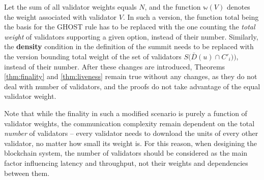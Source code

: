 \documentclass[12pt, fleqn]{article}
\newcommand{\ww}{\mathbb{w}}
\begin{document}
Let the sum of all validator weights equals $N$, and the function $\ww(V)$ denotes the weight associated with validator $V$.
In such a version, the function $\mathrm{total}$ being the basis for the GHOST rule has to be replaced with the one counting the \emph{total weight} of validators supporting a given option, instead of their number. 
Similarly, the \textbf{density} condition in the definition of the summit needs to be replaced with the version bounding total weight of the set of validators  $S\big(\bar{D}(u) \cap C'_i)\big)$, instead of their number. 
After these changes are introduced, Theorems \ref{thm:finality} and \ref{thm:liveness} remain true without any changes, as they do not deal with number of validators, and the proofs do not take advantage of the equal validator weight. 

Note that while the finality in such a modified scenario is purely a function of validator weights, the communication complexity remain dependent on the total \emph{number} of validators -- every validator needs to download the units of every other validator, no matter how small its weight is.
For this reason, when desigining the blockchain system, the number of validators should be considered as the main factor influencing latency and throughput, not their weights and dependencies between them. 






\appendix
\end{document}
